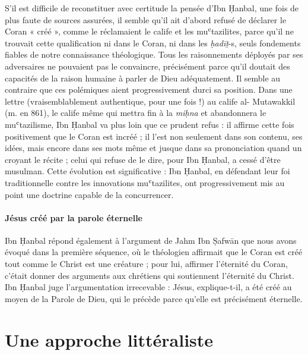 S'il est difficile de reconstituer avec certitude la pensée d'Ibn
Ḥanbal, une fois de plus faute de sources assurées, il semble qu'il ait
d'abord refusé de déclarer le Coran « créé », comme le réclamaient le
calife et les muʿtazilites, parce qu'il ne trouvait cette qualification
ni dans le Coran, ni dans les \emph{ḥadīṯ}-s, seuls fondements fiables
de notre connaissance théologique. Tous les raisonnements déployés par
ses adversaires ne pouvaient pas le convaincre, précisément parce qu'il
doutait des capacités de la raison humaine à parler de Dieu
adéquatement. Il semble au contraire que ces polémiques aient
progressivement durci
sa position. Dans une lettre (vraisemblablement authentique, pour une
fois !) au calife al- Mutawakkil (m. en 861), le calife même qui mettra
fin à la \emph{miḥna} et abandonnera le muʿtazilisme, Ibn Ḥanbal va plus
loin que ce prudent refus : il affirme cette fois positivement que le
Coran est incréé ; il l'est non seulement dans son contenu, ses idées,
mais encore dans ses mots même et jusque dans sa prononciation quand un
croyant le récite ; celui qui refuse de le dire, pour Ibn Ḥanbal, a
cessé d'être musulman. Cette évolution est significative : Ibn Ḥanbal,
en défendant leur foi traditionnelle contre les innovations
muʿtazilites, ont progressivement mis au point une doctrine capable de
la concurrencer.
\paragraph{Jésus créé par la parole éternelle}
Ibn Ḥanbal répond également à l'argument de Jahm Ibn Ṣafwān que nous
avons évoqué dans la première séquence, où le théologien affirmait que
le Coran est créé tout comme le Christ est une créature ; pour lui,
affirmer l'éternité du Coran, c'était donner des arguments aux chrétiens
qui soutiennent l'éternité du Christ. Ibn Ḥanbal juge l'argumentation
irrecevable : Jésus, explique-t-il, a été créé au moyen de la Parole de
Dieu, qui le précède parce qu'elle est précisément éternelle.


\hypertarget{une-approche-littuxe9raliste}{%
\section{Une approche littéraliste}\label{une-approche-littuxe9raliste}}


